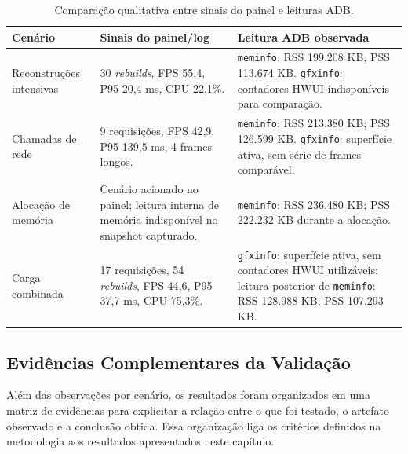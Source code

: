 \begin{table}[H]
\centering
\caption{Comparação qualitativa entre sinais do painel e leituras ADB.}
\label{tab:comparacao-adb}
\small
\renewcommand{\arraystretch}{1.25}
\begin{tabular}{|p{3cm}|p{5.4cm}|p{5.4cm}|}
\hline
\textbf{Cenário} & \textbf{Sinais do painel/log} & \textbf{Leitura ADB observada} \\
\hline
Reconstruções intensivas & 30 \textit{rebuilds}, FPS 55{,}4, P95 20{,}4 ms, CPU 22{,}1\%. & \texttt{meminfo}: RSS 199.208 KB; PSS 113.674 KB. \texttt{gfxinfo}: contadores HWUI indisponíveis para comparação. \\
\hline
Chamadas de rede & 9 requisições, FPS 42{,}9, P95 139{,}5 ms, 4 frames longos. & \texttt{meminfo}: RSS 213.380 KB; PSS 126.599 KB. \texttt{gfxinfo}: superfície ativa, sem série de frames comparável. \\
\hline
Alocação de memória & Cenário acionado no painel; leitura interna de memória indisponível no snapshot capturado. & \texttt{meminfo}: RSS 236.480 KB; PSS 222.232 KB durante a alocação. \\
\hline
Carga combinada & 17 requisições, 54 \textit{rebuilds}, FPS 44{,}6, P95 37{,}7 ms, CPU 75{,}3\%. & \texttt{gfxinfo}: superfície ativa, sem contadores HWUI utilizáveis; leitura posterior de \texttt{meminfo}: RSS 128.988 KB; PSS 107.293 KB. \\
\hline
\end{tabular}
\end{table}

\subsection{Evidências Complementares da Validação}

Além das observações por cenário, os resultados foram organizados em uma matriz de evidências para explicitar a relação entre o que foi testado, o artefato observado e a conclusão obtida. Essa organização liga os critérios definidos na metodologia aos resultados apresentados neste capítulo.

